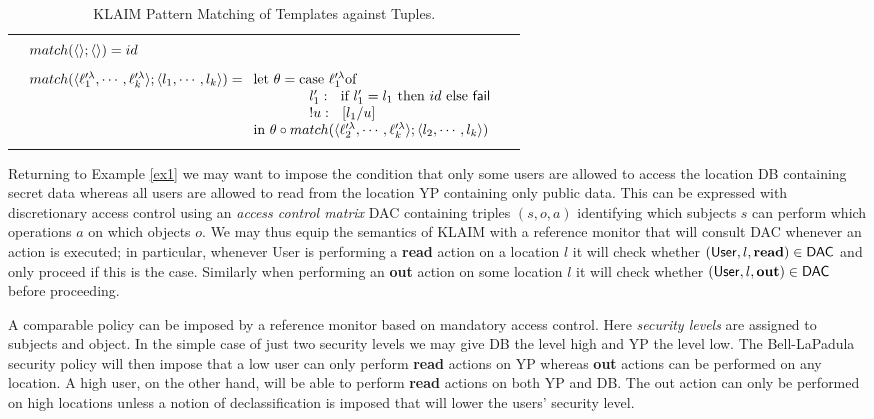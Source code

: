 \documentclass[a4paper]{llncs}
\makeatletter
\newcommand{\YZl}{l}
\newcommand{\Fail}{{\sf fail}}
\newenvironment{ARRAY}[1]{%
  \begin{tabular*}{\textwidth}{@{\extracolsep{\fill}}c@{}c@{}c}
  \hline
  &&\\[-5pt]
  &\begin{math}\begin{array}{@{} #1 @{}}
}
{ \end{array}\end{math}&\\
  &&\\[-5pt]
  \hline
  \end{tabular*}
}
\makeatother
\begin{document}
\begin{table}[t]
\begin{ARRAY}{l}
match(\langle\rangle;\langle\rangle) = id
\\[2ex]
match(\langle\ell'^\lambda_1,\cdots,\ell'^\lambda_k\rangle;\langle\YZl_1,\cdots,\YZl_k\rangle)
= \begin{array}[t]{l}
\hbox{let}\ \theta = \hbox{case}\ \ell'^\lambda_1 \hbox{of}\\
\qquad\qquad\YZl_1':\ \ \hbox{if $\YZl_1' = \YZl_1$ then $id$ else \Fail}\\
\qquad\qquad !u:\ \ [\YZl_1/u]\\
\hbox{in } \theta \circ match(\langle
\ell'^\lambda_2,\cdots,\ell'^\lambda_k\rangle;\langle\YZl_2,\cdots,\YZl_k\rangle)
\end{array}
\end{ARRAY}
\caption{KLAIM Pattern Matching of Templates against Tuples.}
\label{klaim:pattern_matching}
\end{table}



\begin{example}\label{ex3}
Returning to Example \ref{ex1} we may want to impose the condition
that only some users are allowed to access the location {\sf DB}
containing secret data whereas all users are allowed to read from the
location {\sf YP} containing only public data. This can be expressed
with discretionary access control using an \emph{access control
matrix} {\sf DAC} containing triples $(s,o,a)$ identifying which
subjects $s$ can perform which operations $a$ on which objects $o$. We
may thus equip the semantics of KLAIM with a reference monitor that
will consult {\sf DAC} whenever an action is executed; in particular,
whenever {\sf User} is performing a {\bf read} action on a location
$l$ it will check whether $({\sf User},l,{\bf read})\in {\sf DAC}$ and
only proceed if this is the case. Similarly when performing an {\bf
out} action on some location $l$ it will check whether $({\sf
User},l,{\bf out})\in{\sf DAC}$ before proceeding.

A comparable policy can be imposed by a reference monitor based on
mandatory access control.  Here \emph{security levels} are assigned to
subjects and object. In the simple case of just two security levels we
may give {\sf DB} the level {\sf high} and {\sf YP} the level {\sf
low}. The Bell-LaPadula security policy will then impose that a {\sf
low} user can only perform {\bf read} actions on {\sf YP} whereas {\bf
out} actions can be performed on any location. A {\sf high} user, on
the other hand, will be able to perform {\bf read} actions on both
{\sf YP} and {\sf DB}. The {\sf out} action can only be performed on
high locations unless a notion of declassification is imposed that
will lower the users' security level.
\end{example}
\end{document}
